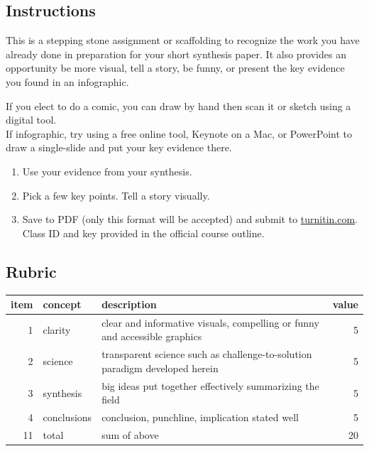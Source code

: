 \documentclass[
]{book}
\providecommand{\tightlist}{%
  \setlength{\itemsep}{0pt}\setlength{\parskip}{0pt}}
\begin{document}
\hypertarget{instructions-2}{%
\subsection*{Instructions}\label{instructions-2}}

This is a stepping stone assignment or scaffolding to recognize the work you have already done in preparation for your short synthesis paper. It also provides an opportunity be more visual, tell a story, be funny, or present the key evidence you found in an infographic.

If you elect to do a comic, you can draw by hand then scan it or sketch using a digital tool.\\
If infographic, try using a free online tool, Keynote on a Mac, or PowerPoint to draw a single-slide and put your key evidence there.

\begin{enumerate}
\def\labelenumi{\arabic{enumi}.}
\tightlist
\item
  Use your evidence from your synthesis.\\
\item
  Pick a few key points. Tell a story visually.
\item
  Save to PDF (only this format will be accepted) and submit to \href{https://www.turnitin.com}{turnitin.com}. Class ID and key provided in the official course outline.
\end{enumerate}

\hypertarget{rubric-1}{%
\subsection*{Rubric}\label{rubric-1}}

\begin{tabular}{rllr}
\toprule
item & concept & description & value\\
\midrule
1 & clarity & clear and informative visuals, compelling or funny and accessible graphics & 5\\
2 & science & transparent science such as challenge-to-solution paradigm developed herein & 5\\
3 & synthesis & big ideas put together effectively summarizing the field & 5\\
4 & conclusions & conclusion, punchline, implication stated well & 5\\
11 & total & sum of above & 20\\
\bottomrule
\end{tabular}
\end{document}
